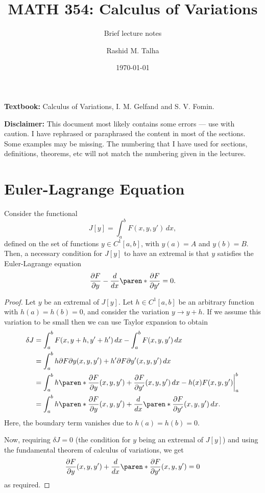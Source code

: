 \documentclass[11pt]{penrose}
\title{MATH 354: Calculus of Variations}
\subtitle{Brief lecture notes}
\author{Rashid M. Talha}
\affiliation{School of Natural Sciences, NUST}
\date{\today}
\begin{document}
\maketitle

\textbf{Textbook:} Calculus of Variations, I. M. Gelfand and S. V. Fomin.


\textbf{Disclaimer:} This document most likely contains some errors --- use with caution. I have rephrased or paraphrased the content in most of the sections. Some examples may be missing. The numbering that I have used for sections, definitions, theorems, etc will not match the numbering given in the lectures.

\section{Euler-Lagrange Equation}
\begin{nthm}
    Consider the functional
    \begin{equation}
        J[y] = \int_{a}^{b} F(x, y, y') \,dx,
    \end{equation}
    defined on the set of functions $y \in C^{1}[a,b]$, with $y(a) = A$ and $y(b) = B$. Then, a necessary condition for $J[y]$ to have an extremal is that $y$ satisfies the Euler-Lagrange equation
    \begin{equation}
        \frac{\pd F}{\pd y} - \frac{d}{dx} \paren*{\frac{\pd F}{\pd y'}} = 0.
        \label{eq:el-basic}
    \end{equation}
\end{nthm}
\begin{proof}
    Let $y$ be an extremal of $J[y]$. Let $h \in C^1 [a,b]$ be an arbitrary function with $h(a)=h(b)=0$, and consider the variation $y \to y+h$. If we assume this variation to be small then we can use Taylor expansion to obtain
    \begin{align}
        \delta J
        &= \int_{a}^{b} F(x, y+h, y'+h') \,dx - \int_{a}^{b} F(x, y, y') \,dx\\
        &= \int_{a}^{b} h {\pd F}{\pd y}(x, y, y') + h' {\pd F}{\pd y'}(x, y, y') \,dx\\
        &= \int_{a}^{b} h \paren*{ \frac{\pd F}{\pd y}(x, y, y') + \frac{\pd F}{\pd y'}(x, y, y') } \,dx - \bigg. h(x) F(x, y, y') \bigg|_a^b\\
        &= \int_{a}^{b} h \paren*{ \frac{\pd F}{\pd y}(x, y, y') + \frac{d}{dx} \paren*{ \frac{\pd F}{\pd y'}(x, y, y')} } \,dx.
    \end{align}
    Here, the boundary term vanishes due to $h(a)=h(b)=0$.

    Now, requiring $\delta J = 0$ (the condition for $y$ being an extremal of $J[y]$) and using the fundamental theorem of calculus of variations, we get
    \begin{equation}
        \frac{\pd F}{\pd y}(x, y, y') + \frac{d}{dx} \paren*{ \frac{\pd F}{\pd y'}(x, y, y')} = 0
    \end{equation}
    as required.
\end{proof}
\end{document}
